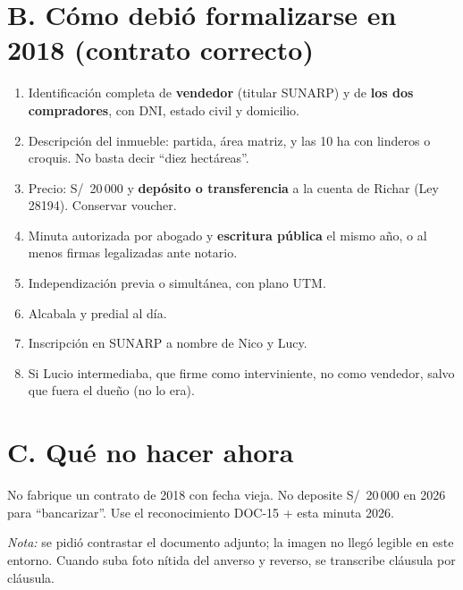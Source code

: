 \documentclass[12pt,a4paper]{article}
\begin{document}
\section*{B. Cómo debió formalizarse en 2018 (contrato correcto)}
\begin{enumerate}[leftmargin=1.15cm]
\item Identificación completa de \textbf{vendedor} (titular SUNARP) y de \textbf{los dos compradores}, con DNI, estado civil y domicilio.
\item Descripción del inmueble: partida, área matriz, y las 10 ha con linderos o croquis. No basta decir ``diez hectáreas''.
\item Precio: S/\ 20\,000 y \textbf{depósito o transferencia} a la cuenta de Richar (Ley 28194). Conservar voucher.
\item Minuta autorizada por abogado y \textbf{escritura pública} el mismo año, o al menos firmas legalizadas ante notario.
\item Independización previa o simultánea, con plano UTM.
\item Alcabala y predial al día.
\item Inscripción en SUNARP a nombre de Nico y Lucy.
\item Si Lucio intermediaba, que firme como interviniente, no como vendedor, salvo que fuera el dueño (no lo era).
\end{enumerate}

\section*{C. Qué no hacer ahora}
No fabrique un contrato de 2018 con fecha vieja. No deposite S/\ 20\,000 en 2026 para ``bancarizar''. Use el reconocimiento DOC-15 + esta minuta 2026.

\vspace{0.4em}
\noindent\textit{Nota:} se pidió contrastar el documento adjunto; la imagen no llegó legible en este entorno. Cuando suba foto nítida del anverso y reverso, se transcribe cláusula por cláusula.

\LugarFecha
{}
\end{document}
